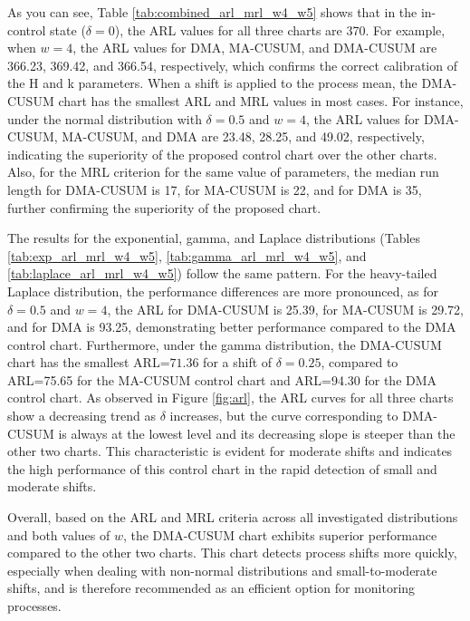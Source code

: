 \documentclass[twoside]{article}
\begin{document}
As you can see, Table \ref{tab:combined_arl_mrl_w4_w5} shows that in the in-control state ($\delta = 0$), the ARL values for all three charts are 370. For example, when $w=4$, the ARL values for DMA, MA-CUSUM, and DMA-CUSUM are 366.23, 369.42, and 366.54, respectively, which confirms the correct calibration of the H and k parameters. When a shift is applied to the process mean, the DMA-CUSUM chart has the smallest ARL and MRL values in most cases. For instance, under the normal distribution with $\delta = 0.5$ and $w=4$, the ARL values for DMA-CUSUM, MA-CUSUM, and DMA are 23.48, 28.25, and 49.02, respectively, indicating the superiority of the proposed control chart over the other charts. Also, for the MRL criterion for the same value of parameters, the median run length for DMA-CUSUM is 17, for MA-CUSUM is 22, and for DMA is 35, further confirming the superiority of the proposed chart.

The results for the exponential, gamma, and Laplace distributions (Tables \ref{tab:exp_arl_mrl_w4_w5}, \ref{tab:gamma_arl_mrl_w4_w5}, and \ref{tab:laplace_arl_mrl_w4_w5}) follow the same pattern. For the heavy-tailed Laplace distribution, the performance differences are more pronounced, as for $\delta = 0.5$ and $w=4$, the ARL for DMA-CUSUM is 25.39, for MA-CUSUM is 29.72, and for DMA is 93.25, demonstrating better performance compared to the DMA control chart. Furthermore, under the gamma distribution, the DMA-CUSUM chart has the smallest ARL=$71.36$ for a shift of $\delta = 0.25$, compared to   ARL=75.65 for the MA-CUSUM control chart and ARL=94.30 for the DMA control chart.
As observed in Figure \ref{fig:arl}, the ARL curves for all three charts show a decreasing trend as $\delta$ increases, but the curve corresponding to DMA-CUSUM is always at the lowest level and its decreasing slope is steeper than the other two charts. This characteristic is evident for moderate shifts and indicates the high performance of this control chart in the rapid detection of small and moderate shifts.

Overall, based on the ARL and MRL criteria across all investigated distributions and both values of $w$, the DMA-CUSUM chart exhibits superior performance compared to the other two charts. This chart detects process shifts more quickly, especially when dealing with non-normal distributions and small-to-moderate shifts, and is therefore recommended as an efficient option for monitoring processes.
\end{document}
